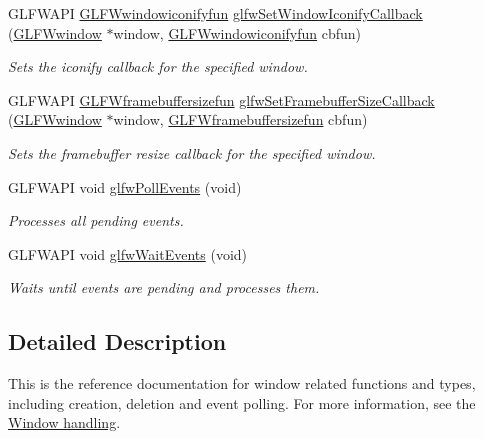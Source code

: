 \begin{DoxyCompactItemize}
\-G\-L\-F\-W\-A\-P\-I \hyperlink{group__window_gae47ae066eea9fe6050a62360928ae524}{\-G\-L\-F\-Wwindowiconifyfun} \hyperlink{group__window_ga17cd86946117b56c76397530900519db}{glfw\-Set\-Window\-Iconify\-Callback} (\hyperlink{group__window_ga3c96d80d363e67d13a41b5d1821f3242}{\-G\-L\-F\-Wwindow} $\ast$window, \hyperlink{group__window_gae47ae066eea9fe6050a62360928ae524}{\-G\-L\-F\-Wwindowiconifyfun} cbfun)
\begin{DoxyCompactList}\small\item\em \-Sets the iconify callback for the specified window. \end{DoxyCompactList}\item 
\-G\-L\-F\-W\-A\-P\-I \hyperlink{group__window_ga311bb32e578aa240b6464af494debffc}{\-G\-L\-F\-Wframebuffersizefun} \hyperlink{group__window_gad766bcdb4465f9c6c62e5d8ca7cfba56}{glfw\-Set\-Framebuffer\-Size\-Callback} (\hyperlink{group__window_ga3c96d80d363e67d13a41b5d1821f3242}{\-G\-L\-F\-Wwindow} $\ast$window, \hyperlink{group__window_ga311bb32e578aa240b6464af494debffc}{\-G\-L\-F\-Wframebuffersizefun} cbfun)
\begin{DoxyCompactList}\small\item\em \-Sets the framebuffer resize callback for the specified window. \end{DoxyCompactList}\item 
\-G\-L\-F\-W\-A\-P\-I void \hyperlink{group__window_ga872d16e4c77f58c0436f356255920cfc}{glfw\-Poll\-Events} (void)
\begin{DoxyCompactList}\small\item\em \-Processes all pending events. \end{DoxyCompactList}\item 
\-G\-L\-F\-W\-A\-P\-I void \hyperlink{group__window_ga6e042d05823c11e11c7339b81a237738}{glfw\-Wait\-Events} (void)
\begin{DoxyCompactList}\small\item\em \-Waits until events are pending and processes them. \end{DoxyCompactList}\end{DoxyCompactItemize}


\subsection{\-Detailed \-Description}
\-This is the reference documentation for window related functions and types, including creation, deletion and event polling. \-For more information, see the \hyperlink{group__window}{\-Window handling}. 

